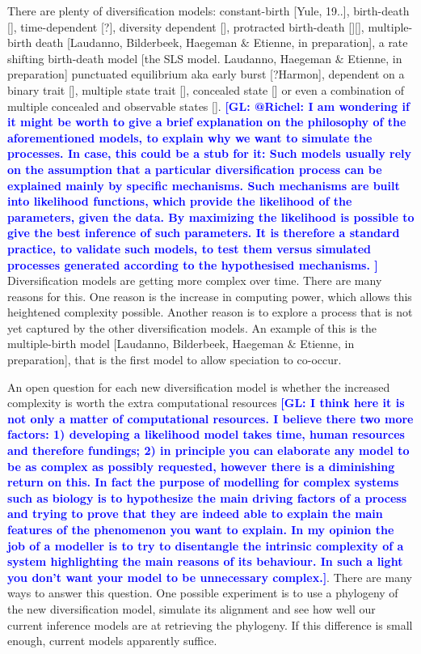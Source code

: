\documentclass{article}
\newcommand{\giovanni}[1]{\textcolor{blue}{\textbf{[GL: #1]}}}
\begin{document}
There are plenty of diversification models: constant-birth [Yule, 19..],
birth-death [\cite{nee1994reconstructed}], time-dependent [?], diversity 
dependent [\cite{etienne2011diversity}], protracted 
birth-death [\cite{rosindell2010protracted}][\cite{etienne2012prolonging}],
multiple-birth death [Laudanno, Bilderbeek, Haegeman $\&$ Etienne, in preparation],
a rate shifting birth-death model [the SLS model. Laudanno, Haegeman $\&$ Etienne, in preparation]
punctuated equilibrium aka early burst [?Harmon],
dependent on a binary trait [\cite{maddison2007estimating}], 
multiple state trait [\cite{fitzjohn2012diversitree}],
concealed state [\cite{beaulieu2016detecting}] or even a combination of multiple concealed and observable states [\cite{herrera2018detecting}].
\giovanni{
@Richel: I am wondering if it might be worth to give a brief explanation on the philosophy of the aforementioned models, to explain why we want to simulate the processes. In case, this could be a stub for it:
Such models usually rely on the assumption that a particular diversification process can be explained mainly by specific mechanisms.
Such mechanisms are built into likelihood functions, which provide the likelihood of the parameters, given the data.
By maximizing the likelihood is possible to give the best inference of such parameters. It is therefore a standard practice, to validate such models, to test them versus simulated processes generated according to the hypothesised mechanisms.
}
Diversification models are getting more complex over time. There are many
reasons for this. One reason is the increase in computing power,
which allows this heightened complexity possible.
Another reason is to explore a process that is not
yet captured by the other diversification models. An example of this
is the multiple-birth model [Laudanno, Bilderbeek, Haegeman $\&$ Etienne, in preparation], 
that is the first model to allow speciation to co-occur.

An open question for each new diversification model is whether the increased
complexity is worth the extra computational resources \giovanni{I think here it is not only a matter of computational resources. I believe there two more factors: 1) developing a likelihood model takes time, human resources and therefore fundings; 2) in principle you can elaborate any model to be as complex as possibly requested, however there is a diminishing return on this. In fact the purpose of modelling for complex systems such as biology is to hypothesize the main driving factors of a process and trying to prove that they are indeed able to explain the main features of the phenomenon you want to explain. In my opinion the job of a modeller is to try to disentangle the intrinsic complexity of a system highlighting the main reasons of its behaviour. In such a light you don't want your model to be unnecessary complex.}. There are many
ways to answer this question. One possible experiment 
is to use a phylogeny of the new diversification model,
simulate its alignment and see how well our
current inference models are at retrieving the phylogeny.
If this difference is small enough, current models apparently
suffice.
\end{document}
